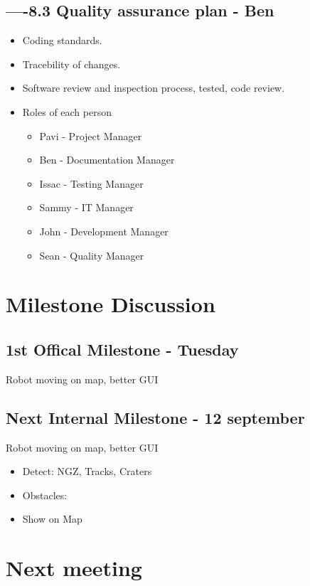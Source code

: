 \documentclass[11pt, a4paper]{article}
\begin{document}
	\subsection*{----8.3 Quality assurance plan - Ben}
	\begin{itemize}
	\item Coding standards.
	\item Tracebility of changes.
	\item Software review and inspection process, tested, code review.
	\item Roles of each person
	\begin{itemize}
		\item Pavi - Project Manager
		\item Ben - Documentation Manager
		\item Issac - Testing Manager
		\item Sammy - IT Manager
		\item John - Development Manager
		\item Sean - Quality Manager
	\end{itemize}		
	\end{itemize}		

	\section{Milestone Discussion}
	\subsection*{1st Offical Milestone - Tuesday}
	Robot moving on map, better GUI

	\subsection*{Next Internal Milestone - 12 september}
	Robot moving on map, better GUI
	\begin{itemize}
		\item Detect: NGZ, Tracks, Craters
		\item Obstacles:
		\item Show on Map
	\end{itemize}		
	
	\section{Next meeting}
	
	
	\vspace*{10pt}
	
\end{document}
